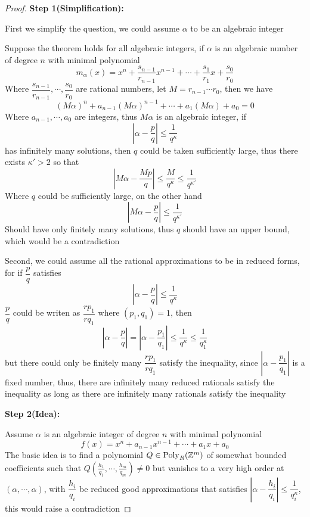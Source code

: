 \begin{proof}
\textbf{Step 1(Simplification):} \par
First we simplify the question, we could assume $ \alpha $ to be an algebraic integer \par
Suppose the theorem holds for all algebraic integers, if $ \alpha $ is an algebraic number of degree $ n $ with minimal polynomial 
$$ m_{\alpha}(x) = x^{n} + \dfrac{s_{n-1}}{r_{n-1}}x^{n-1} + \cdots + \dfrac{s_{1}}{r_{1}}x + \dfrac{s_{0}}{r_{0}} $$
Where $ \dfrac{s_{n-1}}{r_{n-1}}, \cdots, \dfrac{s_{0}}{r_{0}} $ are rational numbers, let $ M = r_{n-1} \cdots r_{0} $, then we have
$$ (M\alpha)^{n} + a_{n-1}(M\alpha)^{n-1} + \cdots + a_{1}(M\alpha) + a_{0} = 0 $$
Where $ a_{n-1}, \cdots, a_{0} $ are integers, thus $ M\alpha $ is an algebraic integer, if
$$ \left| \alpha - \dfrac{p}{q} \right| \leq \dfrac{1}{q^{\kappa}} $$
has infinitely many solutions, then $ q $ could be taken sufficiently large, thus there exists $ \kappa' > 2 $ so that
$$ \left| M\alpha - \dfrac{Mp}{q} \right| \leq \dfrac{M}{q^{\kappa}} \leq \dfrac{1}{q^{\kappa'}} $$
Where $ q $ could be sufficiently large, on the other hand
$$ \left| M\alpha - \dfrac{p}{q} \right| \leq \dfrac{1}{q^{\kappa'}} $$
Should have only finitely many solutions, thus $ q $ should have an upper bound, which would be a contradiction \par
Second, we could assume all the rational approximations to be in reduced forms, for if $ \dfrac{p}{q} $ satisfies
$$ \left| \alpha - \dfrac{p}{q} \right| \leq \dfrac{1}{q^{\kappa}} $$
$ \dfrac{p}{q} $ could be writen as $ \dfrac{rp_{1}}{rq_{1}} $ where $ (p_{1}, q_{1}) = 1 $, then
$$ \left| \alpha - \dfrac{p}{q} \right| = \left| \alpha - \dfrac{p_{1}}{q_{1}} \right| \leq \dfrac{1}{q^{\kappa}} \leq \dfrac{1}{q_{1}^{\kappa}} $$
but there could only be finitely many $ \dfrac{rp_{1}}{rq_{1}} $ satisfy the inequality, since $ \left| \alpha - \dfrac{p_{1}}{q_{1}} \right| $ is a fixed number, thus, there are infinitely many reduced rationals satisfy the inequality as long as there are infinitely many rationals satisfy the inequality \par
\textbf{Step 2(Idea):} \par
Assume $ \alpha $ is an algebraic integer of degree $ n $ with minimal polynomial 
$$ f(x) = x^{n} + a_{n-1}x^{n-1} + \cdots + a_{1}x + a_{0} $$
The basic idea is to find a polynomial $ Q \in \operatorname{Poly}_{R}(\mathbb{Z}^{m}) $ of somewhat bounded coefficients such that $ Q\left(\frac{h_{1}}{q_{1}},\cdots,\frac{h_{m}}{q_{m}}\right) \neq 0 $ but vanishes to a very high order at $ (\alpha,\cdots,\alpha) $, with $ \dfrac{h_{i}}{q_{i}} $ be reduced good approximations that satisfies $ \left| \alpha - \dfrac{h_{i}}{q_{i}} \right| \leq \dfrac{1}{q_{i}^{\kappa}} $, this would raise a contradiction \par

\end{proof}
